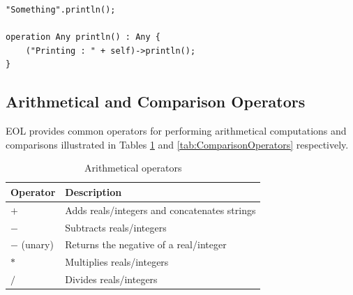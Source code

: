 \begin{lstlisting}[basicstyle=\ttfamily\footnotesize, flexiblecolumns=true, numbers=none, nolol=true, caption=Invoking operations using EOL, label=lst:Expressions, numbers=left, language=EOL, tabsize=2]
"Something".println();

operation Any println() : Any {
	("Printing : " + self)->println();
}
\end{lstlisting}

\subsection{Arithmetical and Comparison Operators}

EOL provides common operators for performing arithmetical computations and comparisons illustrated in Tables \ref{tab:ArithmeticalOperators} and \ref{tab:ComparisonOperators} respectively.

%
%

\begin{longtable} {|p{5.5cm}|p{6.5cm}|}
			
			\caption{Arithmetical operators}
			\label{tab:ArithmeticalOperators}\\
			
			\hline
							
			\textbf{Operator} & \textbf{Description} \\\hline

				$+$ & Adds reals/integers and concatenates strings \\\hline
	
				$-$ & Subtracts reals/integers \\\hline
				
				$-$ (unary) & Returns the negative of a real/integer \\\hline
				
				$*$ & Multiplies reals/integers \\\hline
				
				$/$ & Divides reals/integers \\\hline
				
\end{longtable}


